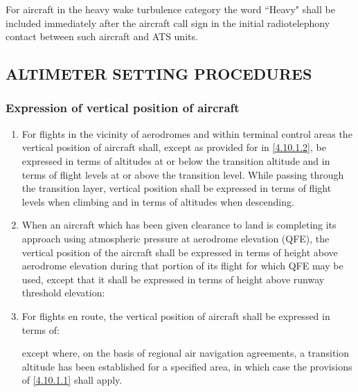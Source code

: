 For aircraft in the heavy wake turbulence category the word ``Heavy" shall be included immediately after the aircraft call sign in the initial radiotelephony contact between such aircraft and ATS units.

\subsection[Altimeter setting procedures]{ALTIMETER SETTING PROCEDURES}

\subsubsection{Expression of vertical position of aircraft}

\begin{enumerate}
    \item \label{4.10.1.1} For flights in the vicinity of aerodromes and within terminal control areas the vertical position of aircraft shall, except as provided for in \ref{4.10.1.2}, be expressed in terms of altitudes at or below the transition altitude and in terms of flight levels at or above the transition level. While passing through the transition layer, vertical position shall be expressed in terms of flight levels when climbing and in terms of altitudes when descending.
    \item \label{4.10.1.2} When an aircraft which has been given clearance to land is completing its approach using atmospheric pressure at aerodrome elevation (QFE), the vertical position of the aircraft shall be expressed in terms of height above aerodrome elevation during that portion of its flight for which QFE may be used, except that it shall be expressed in terms of height above runway threshold elevation:


    \item For flights en route, the vertical position of aircraft shall be expressed in terms of:


    \noindent except where, on the basis of regional air navigation agreements, a transition altitude has been established for a specified area, in which case the provisions of \ref{4.10.1.1} shall apply.
\end{enumerate}


